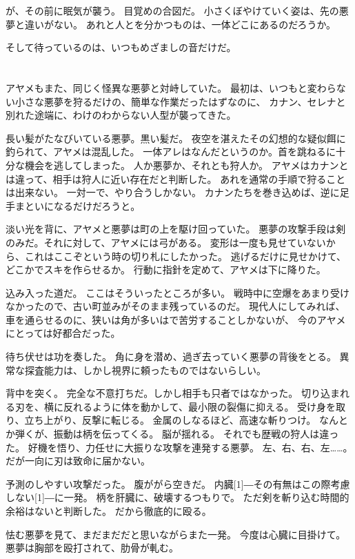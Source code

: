 \documentclass[../IHMain]{subfiles}
\begin{document}
が、その前に眠気が襲う。
目覚めの合図だ。
小さくぼやけていく姿は、先の悪夢と違いがない。
あれと人とを分かつものは、一体どこにあるのだろうか。

そして待っているのは、いつもめざましの音だけだ。

\section{}
アヤメもまた、同じく怪異な悪夢と対峙していた。
最初は、いつもと変わらない小さな悪夢を狩るだけの、簡単な作業だったはずなのに、
カナン、セレナと別れた途端に、わけのわからない人型が襲ってきた。

長い髪がたなびいている悪夢。黒い髪だ。
夜空を湛えたその幻想的な疑似餌に釣られて、アヤメは混乱した。
一体アレはなんだというのか。首を跳ねるに十分な機会を逃してしまった。
人か悪夢か、それとも狩人か。
アヤメはカナンとは違って、相手は狩人に近い存在だと判断した。
あれを通常の手順で狩ることは出来ない。
一対一で、やり合うしかない。
カナンたちを巻き込めば、逆に足手まといになるだけだろうと。

淡い光を背に、アヤメと悪夢は町の上を駆け回っていた。
悪夢の攻撃手段は剣のみだ。それに対して、アヤメには弓がある。
変形は一度も見せていないから、これはここぞという時の切り札にしたかった。
逃げるだけに見せかけて、どこかでスキを作らせるか。
行動に指針を定めて、アヤメは下に降りた。

込み入った道だ。
ここはそういったところが多い。
戦時中に空爆をあまり受けなかったので、古い町並みがそのまま残っているのだ。
現代人にしてみれば、車を通らせるのに、狭いは角が多いはで苦労することしかないが、
今のアヤメにとっては好都合だった。

待ち伏せは功を奏した。
角に身を潜め、過ぎ去っていく悪夢の背後をとる。
異常な探査能力は、しかし視界に頼ったものではないらしい。

背中を突く。
完全な不意打ちだ。しかし相手も只者ではなかった。
切り込まれる刃を、横に反れるように体を動かして、最小限の裂傷に抑える。
受け身を取り、立ち上がり、反撃に転じる。
金属のしなるほど、高速な斬りつけ。
なんとか弾くが、振動は柄を伝ってくる。
脳が揺れる。
それでも歴戦の狩人は違った。
好機を悟り、力任せに大振りな攻撃を連発する悪夢。
左、右、右、左……。
だが一向に刃は致命に届かない。

予測のしやすい攻撃だった。
腹ががら空きだ。
内臓\scalebox{3}[1]{―}その有無はこの際考慮しない\scalebox{3}[1]{―}に一発。
柄を肝臓に、破壊するつもりで。
ただ剣を斬り込む時間的余裕はないと判断した。
だから徹底的に殴る。

怯む悪夢を見て、まだまだだと思いながらまた一発。
今度は心臓に目掛けて。
悪夢は胸部を殴打されて、肋骨が軋む。
\end{document}
